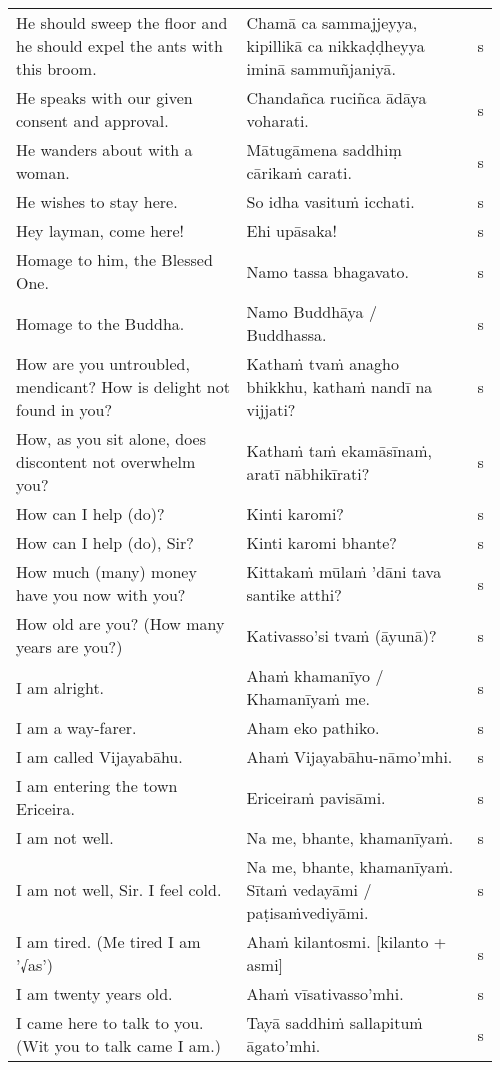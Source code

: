 \documentclass[a5paper]{memoir}
\begin{document}
\begin{longtable}{L{0.48\linewidth} L{0.48\linewidth} H}
He should sweep the floor and he should expel the ants with this broom. & Chamā ca sammajjeyya, kipillikā ca nikkaḍḍheyya iminā sammuñjaniyā. & s\\[0pt]
He speaks with our given consent and approval. & Chandañca ruciñca ādāya voharati. & s\\[0pt]
He wanders about with a woman. & Mātugāmena saddhiṃ cārikaṁ carati. & s\\[0pt]
He wishes to stay here. & So idha vasituṁ icchati. & s\\[0pt]
Hey layman, come here! & Ehi upāsaka! & s\\[0pt]
Homage to him, the Blessed One. & Namo tassa bhagavato. & s\\[0pt]
Homage to the Buddha. & Namo Buddhāya / Buddhassa. & s\\[0pt]
How are you untroubled, mendicant? How is delight not found in you? & Kathaṁ tvaṁ anagho bhikkhu, kathaṁ nandī na vijjati? & s\\[0pt]
How, as you sit alone, does discontent not overwhelm you? & Kathaṁ taṁ ekamāsīnaṁ, aratī nābhikīrati? & s\\[0pt]
How can I help (do)? & Kinti karomi? & s\\[0pt]
How can I help (do), Sir? & Kinti karomi bhante? & s\\[0pt]
How much (many) money have you now with you? & Kittakaṁ mūlaṁ 'dāni tava santike atthi? & s\\[0pt]
How old are you? (How many years are you?) & Kativasso'si tvaṁ (āyunā)? & s\\[0pt]
I am alright. & Ahaṁ khamanīyo / Khamanīyaṁ me. & s\\[0pt]
I am a way-farer. & Aham eko pathiko. & s\\[0pt]
I am called Vijayabāhu. & Ahaṁ Vijayabāhu-nāmo'mhi. & s\\[0pt]
I am entering the town Ericeira. & Ericeiraṁ pavisāmi. & s\\[0pt]
I am not well. & Na me, bhante, khamanīyaṁ. & s\\[0pt]
I am not well, Sir. I feel cold. & Na me, bhante, khamanīyaṁ. Sītaṁ vedayāmi / paṭisaṁvediyāmi. & s\\[0pt]
I am tired. (Me tired I am '√as') & Ahaṁ kilantosmi. [kilanto + asmi] & s\\[0pt]
I am twenty years old. & Ahaṁ vīsativasso'mhi. & s\\[0pt]
I came here to talk to you. (Wit you to talk came I am.) & Tayā saddhiṁ sallapituṁ āgato'mhi. & s\\[0pt]

\end{longtable}
\end{document}
